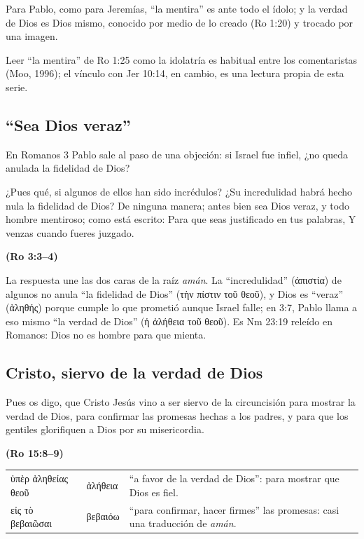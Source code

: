 \documentclass[11pt,letterpaper]{article}
\newcommand{\grc}[1]{\foreignlanguage{ancientgreek}{#1}}
\newcommand{\fuente}[1]{\par\hfill{\upshape\bfseries\small\textcolor{azul}{#1}}}
\begin{document}
Para Pablo, como para Jeremías, ``la mentira'' es ante todo el ídolo; y la verdad de Dios es Dios mismo, conocido por medio de lo creado (Ro 1:20) y trocado por una imagen.

\begin{nota}[Precisión]
Leer ``la mentira'' de Ro 1:25 como la idolatría es habitual entre los comentaristas (Moo, 1996); el vínculo con Jer 10:14, en cambio, es una lectura propia de esta serie.
\end{nota}

\subsection{``Sea Dios veraz''}
En Romanos 3 Pablo sale al paso de una objeción: si Israel fue infiel, ¿no queda anulada la fidelidad de Dios?

\begin{cita}¿Pues qué, si algunos de ellos han sido incrédulos? ¿Su incredulidad habrá hecho nula la fidelidad de Dios? De ninguna manera; antes bien sea Dios veraz, y todo hombre mentiroso; como está escrito: Para que seas justificado en tus palabras, Y venzas cuando fueres juzgado.\fuente{(Ro 3:3--4)}\end{cita}

La respuesta une las dos caras de la raíz \emph{amán}. La ``incredulidad'' (\grc{ἀπιστία}) de algunos no anula ``la fidelidad de Dios'' (\grc{τὴν πίστιν τοῦ θεοῦ}), y Dios es ``veraz'' (\grc{ἀληθής}) porque cumple lo que prometió aunque Israel falle; en 3:7, Pablo llama a eso mismo ``la verdad de Dios'' (\grc{ἡ ἀλήθεια τοῦ θεοῦ}). Es Nm 23:19 releído en Romanos: Dios no es hombre para que mienta.

\subsection{Cristo, siervo de la verdad de Dios}
\begin{cita}Pues os digo, que Cristo Jesús vino a ser siervo de la circuncisión para mostrar la verdad de Dios, para confirmar las promesas hechas a los padres, y para que los gentiles glorifiquen a Dios por su misericordia.\fuente{(Ro 15:8--9)}\end{cita}

\begin{filologia}[Ro 15:8]
\begin{tabular}{@{}L{3.2cm}L{1.6cm}L{10cm}@{}}
\grc{ὑπὲρ ἀληθείας θεοῦ} & \grc{ἀλήθεια} & ``a favor de la verdad de Dios'': para mostrar que Dios es fiel. \\[2pt]
\grc{εἰς τὸ βεβαιῶσαι} & \grc{βεβαιόω} & ``para confirmar, hacer firmes'' las promesas: casi una traducción de \emph{amán}. \\
\end{tabular}
\end{filologia}
\end{document}
